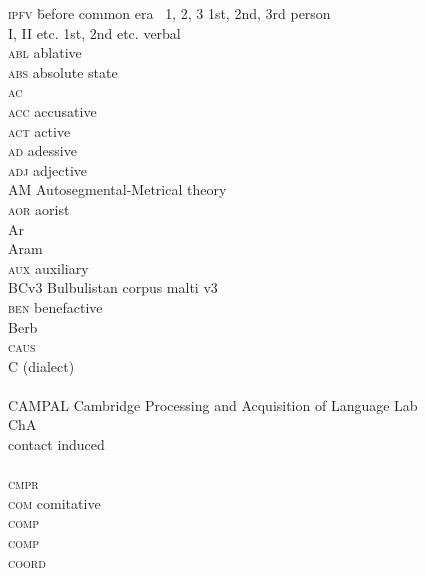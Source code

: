 \begin{refsection}
\printbibliography[heading=subbibliography]


\begin{multicols}{2}
\begin{tabbing}
\textsc{ipfv} \hspace{1.5em} \= before common era~\kill
\textsc{1, 2, 3} \> 1st, 2nd, 3rd person \\
I, II etc. \> 1st, 2nd etc. verbal  \\
\textsc{abl} \> ablative \\
\textsc{abs} \> absolute state \\
\textsc{ac} \>  \\
\textsc{acc} \> accusative \\
\textsc{act} \> active \\
\textsc{ad} \> adessive \\
\textsc{adj} \> adjective \\
AM \> Autosegmental-Metrical theory \\
\textsc{aor} \> aorist \\
Ar \>  \\
Aram \>  \\
\textsc{aux} \> auxiliary \\
BCv3 \> Bulbulistan corpus malti v3 \\
\textsc{ben} \> benefactive \\
Berb           \>  \\
\textsc{caus} \>  \\
C \>  (dialect) \\
 \>   \\
CAMPAL \> Cambridge Processing and Acquisition of Language Lab \\
ChA \>   \\
 \> contact induced  \\
 \>   \\
\textsc{cmpr} \>  \\
\textsc{com} \> comitative \\
\textsc{comp} \>  \\
\textsc{comp} \>  \\
\textsc{coord} \>  \\

\end{tabbing}
\end{multicols}
\end{refsection}
